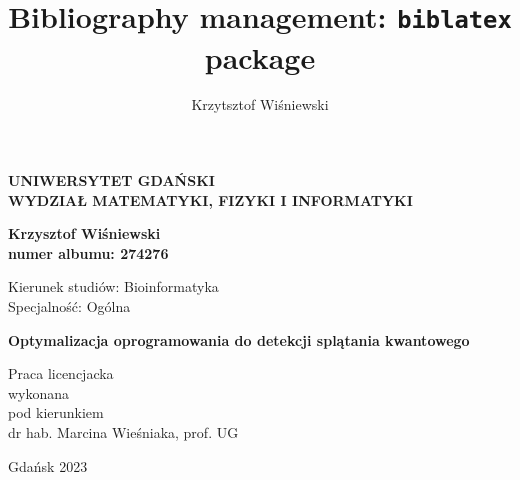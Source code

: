\documentclass[11pt, a4paper]{article}
\title{Bibliography
management:
\texttt{biblatex}
package}
\author{Krzytsztof
Wiśniewski}
\date{
}
\begin{document}
  \begin{titlepage}
    \centering


    \Large \textbf{UNIWERSYTET GDAŃSKI}\\ \textbf{WYDZIAŁ MATEMATYKI, FIZYKI I
    INFORMATYKI}

    \vspace{2.5cm}


    \large \textbf{Krzysztof Wiśniewski}\\ \textbf{numer albumu: 274276}

    \vspace{1.5cm}
    \raggedright \small Kierunek studiów: Bioinformatyka\\ Specjalność: Ogólna

    \vspace{1.5cm}


    \centering
    \Large \textbf{Optymalizacja oprogramowania do detekcji splątania kwantowego}

    \vfill


    \raggedleft \normalsize Praca licencjacka\\ wykonana\\ pod kierunkiem\\ dr hab. Marcina
    Wieśniaka, prof. UG\\

    \vfill


    \centering
    \large Gdańsk 2023
  \end{titlepage}
  \newpage


  \tableofcontents
  \newpage
\end{document}
